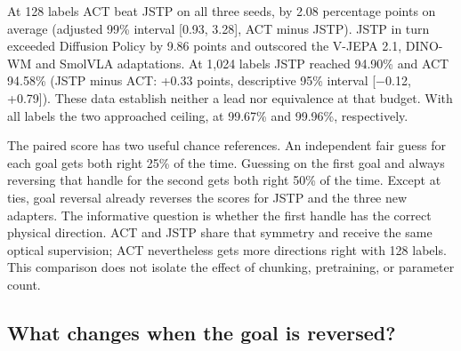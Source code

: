 \documentclass[11pt]{article}
\begin{document}
At 128 labels ACT beat JSTP on all three seeds, by 2.08 percentage points on average (adjusted 99\% interval [0.93, 3.28], ACT minus JSTP). JSTP in turn exceeded Diffusion Policy by 9.86 points and outscored the V-JEPA 2.1, DINO-WM and SmolVLA adaptations. At 1,024 labels JSTP reached 94.90\% and ACT 94.58\% (JSTP minus ACT: +0.33 points, descriptive 95\% interval [\ensuremath{-}0.12, +0.79]). These data establish neither a lead nor equivalence at that budget. With all labels the two approached ceiling, at 99.67\% and 99.96\%, respectively.

The paired score has two useful chance references. An independent fair guess for each goal gets both right 25\% of the time. Guessing on the first goal and always reversing that handle for the second gets both right 50\% of the time. Except at ties, goal reversal already reverses the scores for JSTP and the three new adapters. The informative question is whether the first handle has the correct physical direction. ACT and JSTP share that symmetry and receive the same optical supervision; ACT nevertheless gets more directions right with 128 labels. This comparison does not isolate the effect of chunking, pretraining, or parameter count.

\subsection{What changes when the goal is reversed?}
\end{document}
